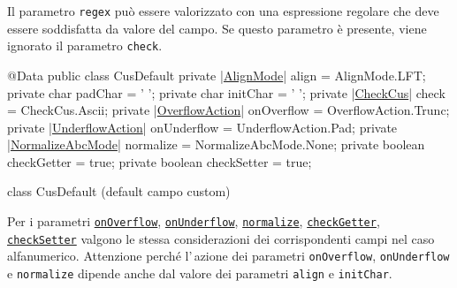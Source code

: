 \documentclass[a4paper,10pt]{report}
\newif\ifesource
\newenvironment{elisting}[1][H]
  {\captionsetup{aboveskip=0pt}\begin{listing}[#1]}
  {\end{listing}%
}
\begin{document}
Il parametro \verb!regex! può essere valorizzato con una espressione regolare
che deve essere soddisfatta da valore del campo. Se questo parametro è presente,
viene ignorato il parametro \verb!check!.

\ifesource
\begin{figure*}[!htb]
\begin{lstlisting}[language=java, 
caption=class CusDefault (default campo custom), 
label=lst:CusDefault]
@Data
public class CusDefault {
    private (*\hyperref[lst:AlignMode]{AlignMode}*) align = AlignMode.LFT;
    private char padChar = ' ';
    private char initChar = ' ';
    private (*\hyperref[lst:CheckCus]{CheckCus}*) check = CheckCus.Ascii;
    private (*\hyperref[lst:OverflowAction]{OverflowAction}*) onOverflow = OverflowAction.Trunc;
    private (*\hyperref[lst:UnderflowAction]{UnderflowAction}*) onUnderflow = UnderflowAction.Pad;
    private (*\hyperref[lst:NormalizeAbcMode]{NormalizeAbcMode}*) normalize = NormalizeAbcMode.None;
    private boolean checkGetter = true;
    private boolean checkSetter = true;
}
\end{lstlisting}\index{CusDefault}
\end{figure*}
\else
\begin{elisting}[!htb]
\begin{javacode}
@Data
public class CusDefault {
    private |\hyperref[lst:AlignMode]{AlignMode}| align = AlignMode.LFT;
    private char padChar = ' ';
    private char initChar = ' ';
    private |\hyperref[lst:CheckCus]{CheckCus}| check = CheckCus.Ascii;
    private |\hyperref[lst:OverflowAction]{OverflowAction}| onOverflow = OverflowAction.Trunc;
    private |\hyperref[lst:UnderflowAction]{UnderflowAction}| onUnderflow = UnderflowAction.Pad;
    private |\hyperref[lst:NormalizeAbcMode]{NormalizeAbcMode}| normalize = NormalizeAbcMode.None;
    private boolean checkGetter = true;
    private boolean checkSetter = true;
}
\end{javacode}
\caption{class CusDefault (default campo custom)}
\label{lst:CusDefault}
\end{elisting}
\fi

Per i parametri \hyperlink{abc:ovf}{\texttt{onOverflow}}, 
\hyperlink{abc:unf}{\texttt{onUnderflow}}, 
\hyperlink{abc:nrm}{\texttt{normalize}},
\hyperlink{abc:get}{\texttt{checkGetter}},
\hyperlink{abc:get}{\texttt{checkSetter}} valgono le stessa considerazioni dei 
corrispondenti campi nel caso alfanumerico. Attenzione perché l'\,azione 
dei parametri \texttt{onOver\-flow}, \verb!onUnderflow! e \verb!normalize! 
dipende anche dal valore dei parametri \verb!align! e \verb!initChar!.
\end{document}
